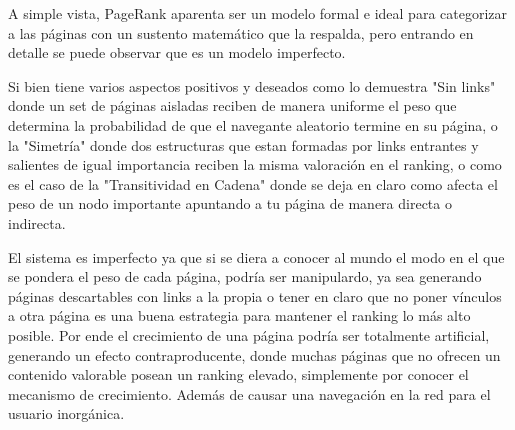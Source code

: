 \vspace{1em}

A simple vista, PageRank aparenta ser un modelo formal e ideal para categorizar a las páginas con un sustento matemático que la respalda, pero entrando en detalle se puede observar que es un modelo imperfecto.  

\vspace{1em}

Si bien tiene varios aspectos positivos y deseados como lo demuestra "Sin links" donde un set de páginas aisladas reciben de manera uniforme el peso que determina la probabilidad de que el navegante aleatorio termine en su página, o la "Simetría" donde dos estructuras que estan formadas por links entrantes y salientes de igual importancia reciben la misma valoración en el ranking, o como es el caso de la "Transitividad en Cadena" donde se deja en claro como afecta el peso de un nodo importante apuntando a tu página de manera directa o indirecta. 

\vspace{1em}

El sistema es imperfecto ya que si se diera a conocer al mundo el modo en el que se pondera el peso de cada página, podría ser manipulardo, ya sea generando páginas descartables con links a la propia o tener en claro que no poner vínculos a otra página es una buena estrategia para mantener el ranking lo más alto posible. Por ende el crecimiento de una página podría ser totalmente artificial, generando un efecto contraproducente, donde muchas páginas que no ofrecen un contenido valorable posean un ranking elevado, simplemente por conocer el mecanismo de crecimiento. Además de causar una navegación en la red para el usuario inorgánica.

